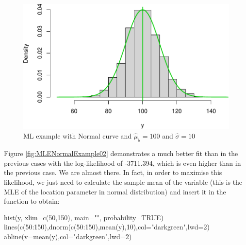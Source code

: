\documentclass[
]{book}
\newenvironment{Shaded}{\begin{snugshade}}{\end{snugshade}}
\newcommand{\AttributeTok}[1]{\textcolor[rgb]{0.77,0.63,0.00}{#1}}
\newcommand{\ConstantTok}[1]{\textcolor[rgb]{0.00,0.00,0.00}{#1}}
\newcommand{\DecValTok}[1]{\textcolor[rgb]{0.00,0.00,0.81}{#1}}
\newcommand{\FunctionTok}[1]{\textcolor[rgb]{0.00,0.00,0.00}{#1}}
\newcommand{\NormalTok}[1]{#1}
\newcommand{\SpecialCharTok}[1]{\textcolor[rgb]{0.00,0.00,0.00}{#1}}
\newcommand{\StringTok}[1]{\textcolor[rgb]{0.31,0.60,0.02}{#1}}
\theoremstyle{definition}
\theoremstyle{definition}
\theoremstyle{definition}
\theoremstyle{definition}
\theoremstyle{remark}
\begin{document}
\begin{figure}
\centering
\includegraphics{Svetunkov---Statistics-for-Business-Analytics_files/figure-latex/MLENormalExample03-1.pdf}
\caption{\label{fig:MLENormalExample03}ML example with Normal curve and \(\hat{\mu}_y=100\) and \(\hat{\sigma}=10\)}
\end{figure}

Figure \ref{fig:MLENormalExample02} demonstrates a much better fit than in the previous cases with the log-likelihood of -3711.394, which is even higher than in the previous case. We are almost there. In fact, in order to maximise this likelihood, we just need to calculate the sample mean of the variable (this is the MLE of the location parameter in normal distribution) and insert it in the function to obtain:

\begin{Shaded}
\begin{Highlighting}[]
\FunctionTok{hist}\NormalTok{(y, }\AttributeTok{xlim=}\FunctionTok{c}\NormalTok{(}\DecValTok{50}\NormalTok{,}\DecValTok{150}\NormalTok{), }\AttributeTok{main=}\StringTok{""}\NormalTok{, }\AttributeTok{probability=}\ConstantTok{TRUE}\NormalTok{)}
\FunctionTok{lines}\NormalTok{(}\FunctionTok{c}\NormalTok{(}\DecValTok{50}\SpecialCharTok{:}\DecValTok{150}\NormalTok{),}\FunctionTok{dnorm}\NormalTok{(}\FunctionTok{c}\NormalTok{(}\DecValTok{50}\SpecialCharTok{:}\DecValTok{150}\NormalTok{),}\FunctionTok{mean}\NormalTok{(y),}\DecValTok{10}\NormalTok{),}\AttributeTok{col=}\StringTok{"darkgreen"}\NormalTok{,}\AttributeTok{lwd=}\DecValTok{2}\NormalTok{)}
\FunctionTok{abline}\NormalTok{(}\AttributeTok{v=}\FunctionTok{mean}\NormalTok{(y),}\AttributeTok{col=}\StringTok{"darkgreen"}\NormalTok{,}\AttributeTok{lwd=}\DecValTok{2}\NormalTok{)}
\end{Highlighting}
\end{Shaded}
\end{document}
